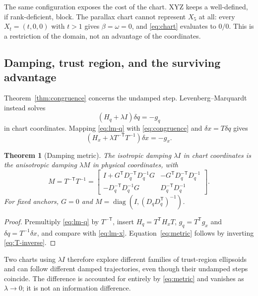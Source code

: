 \documentclass[11pt,a4paper]{article}
\newtheorem{theorem}{Theorem}
\theoremstyle{definition}
\theoremstyle{remark}
\newcommand{\T}{\mathsf{T}}
\begin{document}

The same configuration exposes the cost of the chart. XYZ keeps a well-defined, if rank-deficient, block. The parallax chart cannot represent $X_5$ at all: every $X_t=(t,0,0)$ with $t>1$ gives $\beta=\omega=0$, and \eqref{eq:chart} evaluates to $0/0$. This is a restriction of the domain, not an advantage of the coordinates.

\subsection{Damping, trust region, and the surviving advantage}
\label{sec:damping}

Theorem~\ref{thm:congruence} concerns the undamped step. Levenberg--Marquardt instead solves
\begin{equation}
(H_q+\lambda I)\delta q=-g_q
\label{eq:lm-q}
\end{equation}
in chart coordinates. Mapping \eqref{eq:lm-q} with \eqref{eq:congruence} and $\delta x=T\delta q$ gives
\begin{equation}
\left(H_x+\lambda T^{-\T}T^{-1}\right)\delta x=-g_x .
\label{eq:lm-x}
\end{equation}

\begin{theorem}[Damping metric]\label{thm:damping}
The isotropic damping $\lambda I$ in chart coordinates is the anisotropic damping $\lambda M$ in physical coordinates, with
\begin{equation}
M=T^{-\T}T^{-1}
=\begin{bmatrix}
I+G^{\T}D_q^{-\T}D_q^{-1}G & -G^{\T}D_q^{-\T}D_q^{-1}\\
-D_q^{-\T}D_q^{-1}G & D_q^{-\T}D_q^{-1}
\end{bmatrix}.
\label{eq:metric}
\end{equation}
For fixed anchors, $G=0$ and $M=\operatorname{diag}\!\left(I,(D_qD_q^{\T})^{-1}\right)$.
\end{theorem}
\begin{proof}
Premultiply \eqref{eq:lm-q} by $T^{-\T}$, insert $H_q=T^{\T}H_xT$, $g_q=T^{\T}g_x$ and $\delta q=T^{-1}\delta x$, and compare with \eqref{eq:lm-x}. Equation~\eqref{eq:metric} follows by inverting \eqref{eq:T-inverse}.
\end{proof}

Two charts using $\lambda I$ therefore explore different families of trust-region ellipsoids and can follow different damped trajectories, even though their undamped steps coincide. The difference is accounted for entirely by \eqref{eq:metric} and vanishes as $\lambda\to0$; it is not an information difference.
\end{document}
